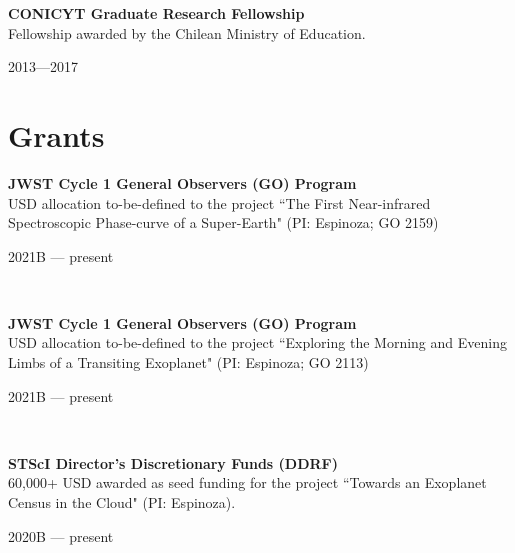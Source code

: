 \documentclass[12pt, a4paper]{article} %
\begin{document}
\begin{minipage}[t]{0.7\textwidth}
\begin{flushleft}%
  \setlength{\leftskip}{0.2cm}%
\textbf{CONICYT Graduate Research Fellowship}\\
Fellowship awarded by the Chilean Ministry of Education.
\end{flushleft}
\end{minipage}
\begin{minipage}[t]{0.3\textwidth}
\hfill 2013---2017
\end{minipage}

\section*{Grants}

\begin{minipage}[t]{0.7\textwidth}
\begin{flushleft}%
  \setlength{\leftskip}{0.2cm}%
\textbf{JWST Cycle 1 General Observers (GO) Program}\\
USD allocation to-be-defined to the project ``The First Near-infrared Spectroscopic Phase-curve of a Super-Earth" (PI: Espinoza; GO 2159)
\end{flushleft}
\end{minipage}
\begin{minipage}[t]{0.3\textwidth}
\hfill 2021B --- present
\end{minipage}\\

\begin{minipage}[t]{0.7\textwidth}
\begin{flushleft}%
  \setlength{\leftskip}{0.2cm}%
\textbf{JWST Cycle 1 General Observers (GO) Program}\\
USD allocation to-be-defined to the project ``Exploring the Morning and Evening Limbs of a Transiting Exoplanet" (PI: Espinoza; GO 2113)
\end{flushleft}
\end{minipage}
\begin{minipage}[t]{0.3\textwidth}
\hfill 2021B --- present
\end{minipage}\\

\begin{minipage}[t]{0.7\textwidth}
\begin{flushleft}%
  \setlength{\leftskip}{0.2cm}%
\textbf{STScI Director's Discretionary Funds (DDRF)}\\
60,000+ USD awarded as seed funding for the project ``Towards an Exoplanet Census in the Cloud" (PI: Espinoza).
\end{flushleft}
\end{minipage}
\begin{minipage}[t]{0.3\textwidth}
\hfill 2020B --- present
\end{minipage}\\
\end{document}
